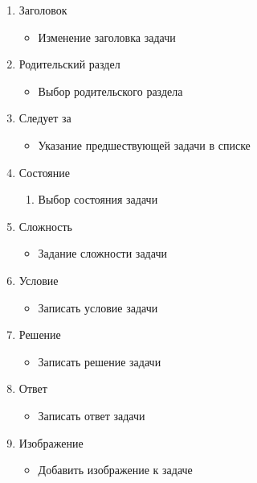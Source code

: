 \begin{enumerate}
\begin{enumerate}
\begin{enumerate}
			\item Заголовок
			\begin{itemize}
				\item Изменение заголовка задачи
			\end{itemize}

			\item Родительский раздел
			\begin{itemize}
				\item Выбор родительского раздела
			\end{itemize}

			\item Следует за
			\begin{itemize}
				\item Указание предшествующей задачи в списке
			\end{itemize}

			\item Состояние
			\begin{enumerate}
				\item Выбор состояния задачи
			\end{enumerate}

			\item Сложность
			\begin{itemize}
				\item Задание сложности задачи
			\end{itemize}

			\item Условие
			\begin{itemize}
				\item Записать условие задачи
			\end{itemize}

			\item Решение
			\begin{itemize}
				\item Записать решение задачи
			\end{itemize}

			\item Ответ
			\begin{itemize}
				\item Записать ответ задачи
			\end{itemize}

			\item Изображение
			\begin{itemize}
				\item Добавить изображение к задаче
			\end{itemize}

		\end{enumerate}
	\end{enumerate}
\end{enumerate}

